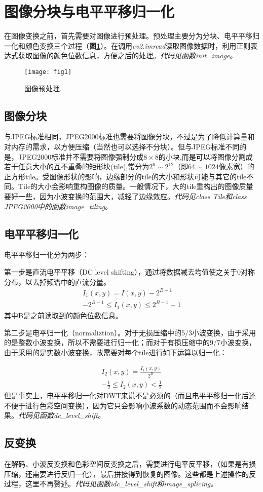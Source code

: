 \section{图像分块与电平平移归一化}

在图像变换之前，首先需要对图像进行预处理。预处理主要分为分块、电平平移归一化和颜色变换三个过程（\textbf{图\ref{fig1}}）。在调用\textit{cv2.imread}读取图像数据时，利用正则表达式获取图像的颜色位数信息，方便之后的处理。\textit{代码见函数init\_image。}

\begin{figure}[H]
	\centering
	\texttt{[image: fig1]}
	\caption{图像预处理.}
	\label{fig1}
\end{figure}

\subsection{图像分块}
与JPEG标准相同，JPEG2000标准也需要将图像分块，不过是为了降低计算量和对内存的需求，以方便压缩（当然也可以选择不分块）。但与JPEG标准不同的是，JPEG2000标准并不需要将图像强制分成$8\times 8$的小块,而是可以将图像分割成若干任意大小的互不重叠的矩形块(tile),常分为$2 ^6\sim 2^{12}$（即$64\sim 1024$像素宽）的正方形tile。受图像形状的影响，边缘部分的tile的大小和形状可能与其它的tile不同。Tile的大小会影响重构图像的质量。一般情况下，大的tile重构出的图像质量要好一些，因为小波变换的范围大，减轻了边缘效应。\textit{代码见class Tile和class JPEG2000中的函数image\_tiling。} \par

\subsection{电平平移归一化}
电平平移归一化分为两步：\par
第一步是直流电平平移（DC level shifting），通过将数据减去均值使之关于0对称分布，以去掉频谱中的直流分量。
\[
\begin{aligned}
I_1(x,y)=I(x,y)-2^{B-1}\\
-2^{B-1}\le I_1(x,y)\le 2^{B-1}-1
\end{aligned}
\]
其中B是之前读取到的颜色位数信息。\par
第二步是电平归一化（normaliztion）。对于无损压缩中的5/3小波变换，由于采用的是整数小波变换，所以不需要进行归一化；而对于有损压缩中的9/7小波变换，由于采用的是实数小波变换，故需要对每个tile进行如下运算以归一化：\par
\[
\begin{aligned}
I_2(x,y)=\frac{I_1(x,y)}{2^{B}}\\
-\frac{1}{2}\le I_2(x,y)<\frac{1}{2}
\end{aligned}
\]
但是事实上，电平平移归一化对DWT来说不是必须的（而且电平平移归一化后还不便于进行色彩空间变换），因为它只会影响小波系数的动态范围而不会影响结果。\textit{代码见函数dc\_level\_shift。}

\subsection{反变换}
在解码、小波反变换和色彩空间反变换之后，需要进行电平反平移，（如果是有损压缩，还需要进行反归一化），最后拼接得到恢复的图像。这些都是上述操作的反过程，这里不再赘述。\textit{代码见函数idc\_level\_shift和image\_splicing。}



